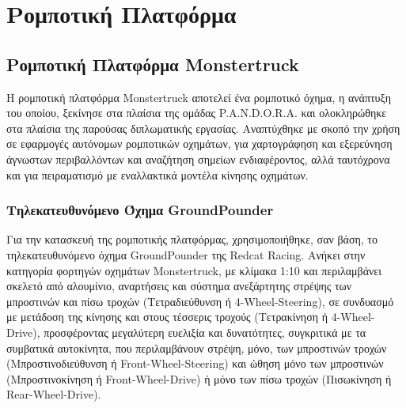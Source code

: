 \chapter{Ρομποτική Πλατφόρμα} \label{Chapter2}

\section{Ρομποτική Πλατφόρμα {Monstertruck}} \label{sec:robotic_platform}
Η ρομποτική πλατφόρμα {Monstertruck} αποτελεί ένα ρομποτικό όχημα, η ανάπτυξη του οποίου, ξεκίνησε στα πλαίσια της ομάδας P.A.N.D.O.R.A. και ολοκληρώθηκε στα πλαίσια της παρούσας διπλωματικής εργασίας. Αναπτύχθηκε με σκοπό την χρήση σε εφαρμογές αυτόνομων ρομποτικών οχημάτων, για χαρτογράφηση και εξερεύνηση άγνωστων περιβαλλόντων και αναζήτηση σημείων ενδιαφέροντος, αλλά ταυτόχρονα και για πειραματισμό με εναλλακτικά μοντέλα κίνησης οχημάτων.

\subsection{Τηλεκατευθυνόμενο Όχημα GroundPounder} \label{ssec:groundpounder}
Για την κατασκευή της ρομποτικής πλατφόρμας, χρησιμοποιήθηκε, σαν βάση, το τηλεκατευθυνόμενο όχημα GroundPounder της Redcat Racing. Ανήκει στην κατηγορία φορτηγών οχημάτων Monstertruck, με κλίμακα 1:10 και περιλαμβάνει σκελετό από αλουμίνιο, αναρτήσεις και σύστημα ανεξάρτητης στρέψης των μπροστινών και πίσω τροχών (Τετραδιεύθυνση ή 4-Wheel-Steering), σε συνδυασμό με μετάδοση της κίνησης και στους τέσσερις τροχούς ({Τετρακίνηση} ή {4-Wheel-Drive}), προσφέροντας μεγαλύτερη ευελιξία και δυνατότητες, συγκριτικά με τα συμβατικά αυτοκίνητα, που περιλαμβάνουν στρέψη, μόνο, των μπροστινών τροχών ({Μπροστινοδιεύθυνση ή Front-Wheel-Steering}) και ώθηση μόνο των μπροστινών ({Μπροστινοκίνηση ή Front-Wheel-Drive}) ή μόνο των πίσω τροχών ({Πισωκίνηση ή Rear-Wheel-Drive}).

